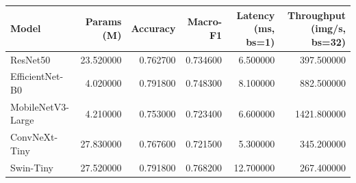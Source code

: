\begin{tabular}{lrrrrr}
\toprule
Model & Params (M) & Accuracy & Macro-F1 & Latency (ms, bs=1) & Throughput (img/s, bs=32) \\
\midrule
ResNet50 & 23.520000 & 0.762700 & 0.734600 & 6.500000 & 397.500000 \\
EfficientNet-B0 & 4.020000 & 0.791800 & 0.748300 & 8.100000 & 882.500000 \\
MobileNetV3-Large & 4.210000 & 0.753000 & 0.723400 & 6.600000 & 1421.800000 \\
ConvNeXt-Tiny & 27.830000 & 0.767600 & 0.721500 & 5.300000 & 345.200000 \\
Swin-Tiny & 27.520000 & 0.791800 & 0.768200 & 12.700000 & 267.400000 \\
\bottomrule
\end{tabular}
